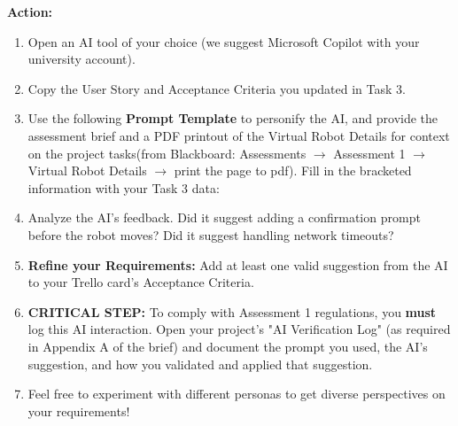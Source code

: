 \documentclass[a4paper,12pt]{article}
\begin{document}
\vspace{0.3cm}
\textbf{Action:}
\begin{enumerate}
    \item Open an AI tool of your choice (we suggest Microsoft Copilot with your university account).
    \item Copy the User Story and Acceptance Criteria you updated in Task 3.
    \item Use the following \textbf{Prompt Template} to personify the AI, and provide the assessment brief and a PDF printout of the Virtual Robot Details for context on the project tasks(from Blackboard: Assessments $\rightarrow$ Assessment 1 $\rightarrow$ Virtual Robot Details $\rightarrow$ print the page to pdf). Fill in the bracketed information with your Task 3 data:
    
    \begin{center}
    \end{center}

    \item Analyze the AI's feedback. Did it suggest adding a confirmation prompt before the robot moves? Did it suggest handling network timeouts? 
    \item \textbf{Refine your Requirements:} Add at least one valid suggestion from the AI to your Trello card's Acceptance Criteria.
    \item \textbf{CRITICAL STEP:} To comply with Assessment 1 regulations, you \textbf{must} log this AI interaction. Open your project's "AI Verification Log" (as required in Appendix A of the brief) and document the prompt you used, the AI's suggestion, and how you validated and applied that suggestion.
    \item Feel free to experiment with different personas to get diverse perspectives on your requirements!
\end{enumerate}
\end{document}
